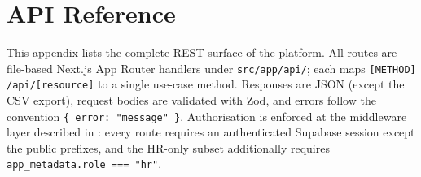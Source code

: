 \chapter{API Reference}
\label{app:api}

This appendix lists the complete REST surface of the platform. All routes are
file-based Next.js App Router handlers under \texttt{src/app/api/}; each maps
\texttt{[METHOD] /api/[resource]} to a single use-case method. Responses are
JSON (except the CSV export), request bodies are validated with Zod, and
errors follow the convention \texttt{\{ error: "message" \}}. Authorisation is
enforced at the middleware layer described in
: every route requires an authenticated
Supabase session except the public prefixes, and the HR-only subset
additionally requires \texttt{app\_metadata.role === "hr"}.

